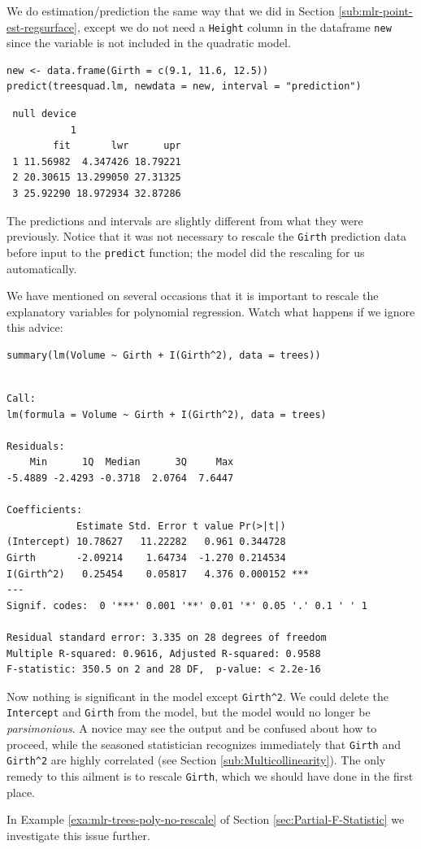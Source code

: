 \documentclass[captions=tableheading]{scrbook}
\begin{document}
We do estimation/prediction the same way that we did in Section \ref{sub:mlr-point-est-regsurface}, except we do not need a \texttt{Height} column in the dataframe \texttt{new} since the variable is not included in the quadratic model.


\begin{verbatim}
new <- data.frame(Girth = c(9.1, 11.6, 12.5))
predict(treesquad.lm, newdata = new, interval = "prediction")
\end{verbatim}

\begin{verbatim}
 null device 
           1
        fit       lwr      upr
 1 11.56982  4.347426 18.79221
 2 20.30615 13.299050 27.31325
 3 25.92290 18.972934 32.87286
\end{verbatim}

The predictions and intervals are slightly different from what they were previously. Notice that it was not necessary to rescale the \texttt{Girth} prediction data before input to the \texttt{predict} function; the model did the rescaling for us automatically.

\begin{rem}
We have mentioned on several occasions that it is important to rescale the explanatory variables for polynomial regression. Watch what happens if we ignore this advice:


\begin{verbatim}
summary(lm(Volume ~ Girth + I(Girth^2), data = trees))
\end{verbatim}


\begin{verbatim}

Call:
lm(formula = Volume ~ Girth + I(Girth^2), data = trees)

Residuals:
    Min      1Q  Median      3Q     Max 
-5.4889 -2.4293 -0.3718  2.0764  7.6447 

Coefficients:
            Estimate Std. Error t value Pr(>|t|)    
(Intercept) 10.78627   11.22282   0.961 0.344728    
Girth       -2.09214    1.64734  -1.270 0.214534    
I(Girth^2)   0.25454    0.05817   4.376 0.000152 ***
---
Signif. codes:  0 '***' 0.001 '**' 0.01 '*' 0.05 '.' 0.1 ' ' 1 

Residual standard error: 3.335 on 28 degrees of freedom
Multiple R-squared: 0.9616,	Adjusted R-squared: 0.9588 
F-statistic: 350.5 on 2 and 28 DF,  p-value: < 2.2e-16
\end{verbatim}

Now nothing is significant in the model except \texttt{Girth\textasciicircum{}2}. We could delete the \texttt{Intercept} and \texttt{Girth} from the model, but the model would no longer be \emph{parsimonious}. A novice may see the output and be confused about how to proceed, while the seasoned statistician recognizes immediately that \texttt{Girth} and \texttt{Girth\textasciicircum{}2} are highly correlated (see Section \ref{sub:Multicollinearity}). The only remedy to this ailment is to rescale \texttt{Girth}, which we should have done in the first place.

In Example \ref{exa:mlr-trees-poly-no-rescale} of Section \ref{sec:Partial-F-Statistic} we investigate this issue further.

\end{rem}
\end{document}
